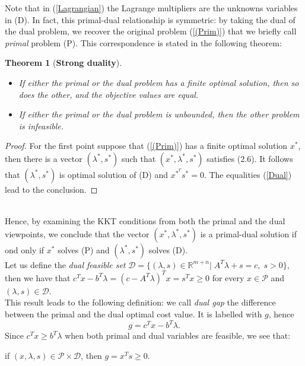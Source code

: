 \documentclass[a4paper,10 pt,titlepage,twoside]{book}
\theoremstyle{plain}
\newtheorem{thm}{Theorem}[chapter]
\theoremstyle{definition}
\theoremstyle{remark}
\begin{document}
Note that in (\ref{Lagrangian}) the Lagrange multipliers are the unknowns variables in (D). In fact, this primal-dual relationship is symmetric: by taking the dual of the dual problem, we recover the original problem (\ref{(Prim)}) that we briefly call \textit{primal} problem (P). This correspondence is stated in the following theorem:
\begin{thm}[\textbf{Strong duality}] 
	\begin{itemize}
		\
		\item If either the primal or the dual problem has a finite optimal solution, then so does the other, and the objective values are equal.
		\item If either the primal or the dual problem is unbounded, then the other problem is infeasible.
	\end{itemize}
\end{thm}
\begin{proof}
For the first point suppose that (\ref{(Prim)}) has a finite optimal solution $x^{*}$, then there is a vector $(\lambda^{*},s^{*})$ such that $\left(x^{*},\lambda^{*},s^{*}\right)$ satisfies (2.6). It follows that $\left(\lambda^{*},s^{*}\right)$ is optimal solution of (D) and $x^{*}^{T}s^{*}=0$. The equalities (\ref{Dual}) lead to the conclusion. 
\end{proof}
\\[0.5 cm] Hence, by examining the KKT conditions from both the primal and the dual viewpoints, we conclude that the vector $(x^{*},\lambda^{*},s^{*})$ is a primal-dual solution if ond only if $x^{*}$ solves (P) and $(\lambda^{*},s^{*})$ solves (D).\\[1cm]
Let us define the \textit{dual feasible set} $\mathcal{D}=\{(\lambda,s)\in\mathbb{R}^{m+n}|\;A^{T}\lambda+s= c,\;s>0\}$, then we have that $c^{T}x-b^{T}\lambda=\left(c-A^{T}\lambda\right)^{T}x=s^{T}x \geq0$ for every $x\in\mathcal{P}$ and $\left(\lambda,s\right)\in\mathcal{D}$.\\
This result leads to the following definition: we call \textit{dual gap} the difference between the primal and the dual optimal cost value. It is labelled with $g$, hence
\begin{equation}\label{dualgap}\tag{2.8}
g = c^{T}x - b^{T}\lambda.
\end{equation}
Since $c^{T}x\geq b^{T}\lambda$ when both primal and dual variables are feasible, we see that:\begin{center}
	if $(x,\lambda,s)\in\mathcal{P}\times\mathcal{D}$, then $g= x^{T}s \geq0$.
\end{center}
\end{document}
